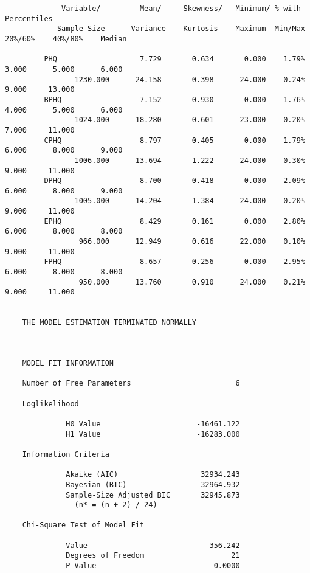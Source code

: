 \documentclass[11pt]{article}
\begin{document}
\begin{verbatim}
             Variable/         Mean/     Skewness/   Minimum/ % with                Percentiles
            Sample Size      Variance    Kurtosis    Maximum  Min/Max      20%/60%    40%/80%    Median
    
         PHQ                   7.729       0.634       0.000    1.79%       3.000      5.000      6.000
                1230.000      24.158      -0.398      24.000    0.24%       9.000     13.000
         BPHQ                  7.152       0.930       0.000    1.76%       4.000      5.000      6.000
                1024.000      18.280       0.601      23.000    0.20%       7.000     11.000
         CPHQ                  8.797       0.405       0.000    1.79%       6.000      8.000      9.000
                1006.000      13.694       1.222      24.000    0.30%       9.000     11.000
         DPHQ                  8.700       0.418       0.000    2.09%       6.000      8.000      9.000
                1005.000      14.204       1.384      24.000    0.20%       9.000     11.000
         EPHQ                  8.429       0.161       0.000    2.80%       6.000      8.000      8.000
                 966.000      12.949       0.616      22.000    0.10%       9.000     11.000
         FPHQ                  8.657       0.256       0.000    2.95%       6.000      8.000      8.000
                 950.000      13.760       0.910      24.000    0.21%       9.000     11.000
    
    
    THE MODEL ESTIMATION TERMINATED NORMALLY
    
    
    
    MODEL FIT INFORMATION
    
    Number of Free Parameters                        6
    
    Loglikelihood
    
              H0 Value                      -16461.122
              H1 Value                      -16283.000
    
    Information Criteria
    
              Akaike (AIC)                   32934.243
              Bayesian (BIC)                 32964.932
              Sample-Size Adjusted BIC       32945.873
                (n* = (n + 2) / 24)
    
    Chi-Square Test of Model Fit
    
              Value                            356.242
              Degrees of Freedom                    21
              P-Value                           0.0000
    

\end{verbatim}
\end{document}
